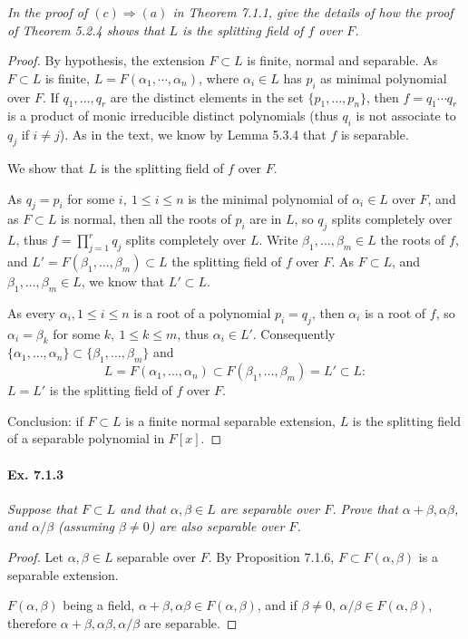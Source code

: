\documentclass[11pt,a4paper]{article}
\begin{document}
{\it In the proof of $(c) \Rightarrow (a)$ in Theorem 7.1.1, give the details of how the proof of Theorem 5.2.4 shows that $L$ is the splitting field of $f$ over $F$.
}


\begin{proof}
By hypothesis, the extension $F \subset L$ is finite, normal and separable. As $F \subset L$ is finite,  $L = F(\alpha_1,\cdots,\alpha_n)$, where  $\alpha_i \in L$ has  $p_i$ as minimal polynomial over $F$. If $q_1,\ldots,q_r$ are the distinct elements in the set $\{p_1,\ldots,p_n\}$, then  $f = q_1\cdots q_r$ is a product of monic irreducible distinct polynomials (thus $q_i$ is not associate to $q_j$ if $i\ne j$). As in the text, we know by Lemma 5.3.4 that $f$ is separable.

We show that $L$ is the splitting field of $f$ over $F$.

As $q_j = p_i$ for some $i,\ 1\leq i \leq n$ is the minimal polynomial of $\alpha_i \in L$ over $F$, and as $F \subset L$ is normal, then  all the roots of $p_i$ are in $L$, so $q_j$ splits completely over $L$, thus $f =\prod_{j=1}^r q_j$ splits completely over $L$. Write $\beta_1,\ldots,\beta_m \in L$ the roots of $f$, and $L'=F(\beta_1,\ldots,\beta_m) \subset L$ the splitting  field of $f$ over $F$. As $F \subset L$, and $\beta_1,\ldots,\beta_m \in L$, we know that $L' \subset L$.

As every $\alpha_i,1\leq i \leq n$ is a root of a polynomial $p_i = q_j$, then $\alpha_i$ is a root of $f$, so $\alpha_i = \beta_k$ for some $k,\ 1\leq k \leq m$, thus $\alpha_i \in L'$. Consequently $\{\alpha_1,\ldots,\alpha_n\}\subset \{\beta_1,\ldots,\beta_m\}$ and 
$$L = F(\alpha_1,\ldots,\alpha_n) \subset F(\beta_1,\ldots,\beta_m) = L' \subset  L :$$
$L=L'$ is the splitting field of $f$ over $F$.

Conclusion: if $F\subset L$ is a finite normal separable extension, $L$ is the splitting field of a separable polynomial in $F[x]$.
\end{proof}

\paragraph{Ex. 7.1.3}

{\it Suppose that $F \subset L$ and that $\alpha, \beta \in L$ are separable over $F$. Prove that $\alpha + \beta, \alpha \beta$, and $\alpha/\beta$ (assuming $\beta \ne 0$) are also separable over $F$.
}

\begin{proof}

Let $\alpha,\beta \in L$ separable over $F$. By Proposition 7.1.6, $F \subset F(\alpha,\beta)$ is a separable extension.

$F(\alpha,\beta)$ being a field,  $\alpha + \beta,\alpha \beta \in F(\alpha,\beta)$, and if $\beta \neq 0$, $\alpha/\beta \in F(\alpha,\beta)$, therefore $\alpha + \beta, \alpha \beta, \alpha/\beta$ are separable.
\end{proof}
\end{document}
